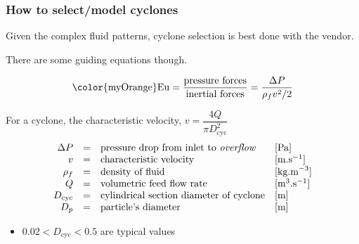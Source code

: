 \begin{frame}\frametitle{How to select/model cyclones}
	{\color{myOrange}Given the complex fluid patterns, cyclone selection is best done with the vendor.}
	
	\vspace{12pt}
	There are some guiding equations though.
	\begin{exampleblock}{}
		\[\text{{\color{myOrange}Eu}} = \dfrac{\text{pressure forces}}{\text{inertial forces}} = \dfrac{\Delta P}{\rho_f v^2 / 2}\]
	\end{exampleblock}
	
	\vspace{12pt}
	For a cyclone, the characteristic velocity, $v = \dfrac{4Q}{\pi D_\text{cyc}^2}$ %
	\[
		\begin{array}{rcll}
			\Delta P&=& \text{pressure drop from inlet to \emph{overflow}} 	&[\text{Pa}]\\
			v 	    &=& \text{characteristic velocity}                     	&[\text{m.s}^{-1}]\\
			\rho_f  &=& \text{density of fluid}  							&[\text{kg.m}^{-3}]\\
			Q   	&=& \text{volumetric feed flow rate}					&[\text{m}^{3}\text{.s}^{-1}]\\
			D_\text{cyc}&=& \text{cylindrical section diameter of cyclone}	&[\text{m}] \\
			D_p 	&=& \text{particle's diameter} &[\text{m}]
		\end{array}
	\]
	\begin{itemize}
		\item	$0.02 < D_\text{cyc} <  0.5$ are typical values
	\end{itemize}
\end{frame}

